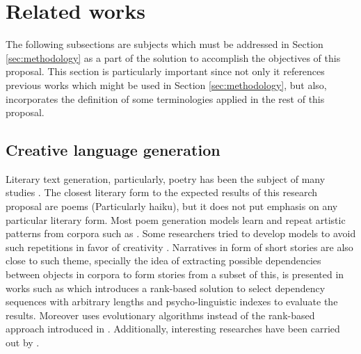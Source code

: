 \documentclass{article}
\begin{document}
	\section {Related works} \label{sec:related-works}
	The following subsections are subjects which must be addressed in Section \ref{sec:methodology} as a part of the solution to accomplish the objectives of this proposal. This section is particularly important since not only it references previous works which might be used in Section \ref{sec:methodology}, but also, incorporates the definition of some terminologies applied in the rest of this proposal. 
	\subsection{Creative language generation}
	Literary text generation, particularly, poetry has been the subject of many studies \citet{oliveira-2017-a-survey-on-intelligent-poetry-generation-languages-features, lamb-2017-a-taxonomy-of-generative-poetry-techniques}.
	The closest literary form to the expected results of this research proposal are poems (Particularly haiku), but it does not put emphasis on any particular literary form. Most poem generation models learn and repeat artistic patterns from corpora such as \citet{daza-2016-automatic-text-generation-by-learning-from-literary-structures}. Some researchers tried to develop models to avoid such repetitions in favor of creativity \citep{wu-2019-evaluating-image-inspired-poetry-generation}. Narratives in form of short stories are also close to such theme, specially the idea of extracting possible dependencies between objects in corpora to form stories from a subset of this, is presented in works such as \citet{mcintyre-2009-learning-to-tell-tales-a-data-driven-approach-to-story-generation} which introduces a rank-based solution to select dependency sequences with arbitrary lengths and psycho-linguistic indexes to evaluate the results. Moreover \citet{mcintyre-2010-plot-induction-and-evolutionary-search-for-story-generation} uses evolutionary algorithms instead of the rank-based approach introduced in \citet{mcintyre-2009-learning-to-tell-tales-a-data-driven-approach-to-story-generation}. Additionally, interesting researches have been carried out by \cite{veale-2013-once-more-with-feeling-using-creative-affective-metaphors-to-express-information-needs,veale-2013-creativity-as-a-web-service-a-vision-of-human-and-computer-creativity-in-the-web-era,gervas-2009-computational-approaches-to-storytelling-and-creativity,perez-2015-from-mexica-to-mexica-impro-the-evolution-of-a-computer-model-for-plot-generation}.
\end{document}
